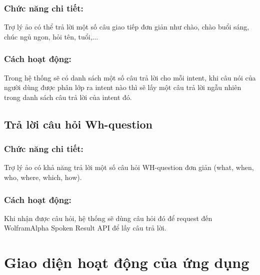 \subsubsection{Chức năng chi tiết:}

Trợ lý ảo có thể trả lời một số câu giao tiếp đơn giản như chào, chào buổi sáng, chúc ngủ ngon, hỏi tên, tuổi,...

\subsubsection{Cách hoạt động:}

Trong hệ thống sẽ có danh sách một số câu trả lời cho mỗi intent, khi câu nói của người dùng được phân lớp ra intent nào thì sẽ lấy một câu trả lời ngẫu nhiên trong danh sách câu trả lời của intent đó.

\subsection{Trả lời câu hỏi Wh-question}

\subsubsection{Chức năng chi tiết:}

Trợ lý ảo có khả năng trả lời một số câu hỏi WH-question đơn giản (what, when, who, where, which, how).

\subsubsection{Cách hoạt động:}

Khi nhận được câu hỏi, hệ thống sẽ dùng câu hỏi đó để request đến WolframAlpha Spoken Result API để lấy câu trả lời.

\section{Giao diện hoạt động của ứng dụng}

